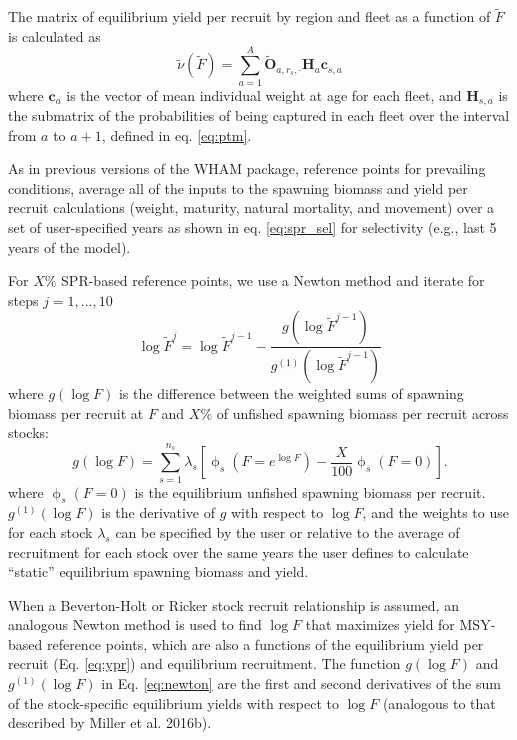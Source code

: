 \documentclass[
]{article}
\begin{document}
The matrix of equilibrium yield per recruit by region and fleet as a function of \(\widetilde F\) is calculated as
\begin{equation}\label{eq:ypr}
 \widetilde{\nu}({\widetilde{F}}) = \sum^{A}_{a=1} \widetilde{\mathbf{O}}_{a,r_s,\cdot} \mathbf{H}_{a} \mathbf{c}_{s,a}
\end{equation}
where \(\mathbf{c}_a\) is the vector of mean individual weight at age for each fleet, and \(\mathbf{H}_{s,a}\) is the submatrix of the probabilities of being captured in each fleet over the interval from \(a\) to \(a+1\), defined in eq. \ref{eq:ptm}.

As in previous versions of the WHAM package, reference points for prevailing conditions, average all of the inputs to the spawning biomass and yield per recruit calculations (weight, maturity, natural mortality, and movement) over a set of user-specified years as shown in eq. \ref{eq:spr_sel} for selectivity (e.g., last 5 years of the model).

For \(X\%\) SPR-based reference points, we use a Newton method and iterate for steps \(j = 1,\ldots,10\)
\begin{equation}\label{eq:newton}
  \log\widetilde{F}^{j} = \log\widetilde{F}^{j-1} - \frac{g\left(\log\widetilde{F}^{j-1}\right)}{g^{(1)}\left(\log\widetilde{F}^{j-1}\right)}
\end{equation}
where \(g(\log F)\) is the difference between the weighted sums of spawning biomass per recruit at \(F\) and \(X\)\% of unfished spawning biomass per recruit across stocks:
\begin{equation}\label{eq:newton-obj}
  g(\log F) = \sum^{n_s}_{s=1} \lambda_s\left[\upphi_s\left(F = e^{\log F}\right) - \frac{X}{100}\upphi_s\left(F=0\right)\right].
\end{equation}
where \(\upphi_s\left(F=0\right)\) is the equilibrium unfished spawning biomass per recruit. \(g^{(1)}(\log F)\) is the derivative of \(g\) with respect to \(\log F\), and the weights to use for each stock \(\lambda_s\) can be specified by the user or relative to the average of recruitment for each stock over the same years the user defines to calculate ``static'' equilibrium spawning biomass and yield.

When a Beverton-Holt or Ricker stock recruit relationship is assumed, an analogous Newton method is used to find \(\log F\) that maximizes yield for MSY-based reference points, which are also a functions of the equilibrium yield per recruit (Eq. \ref{eq:ypr}) and equilibrium recruitment. The function \(g(\log F)\) and \(g^{(1)}(\log F)\) in Eq. \ref{eq:newton} are the first and second derivatives of the sum of the stock-specific equilibrium yields with respect to \(\log F\) (analogous to that described by Miller et al. 2016b).
\end{document}
